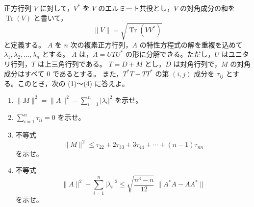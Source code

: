 \newcommand{\C}{\mathbb{C}}
\newcommand{\R}{\mathbb{R}}
\newcommand{\Z}{\mathbb{Z}}
\newcommand{\Tr}{\operatorname{Tr}}
\newcommand{\Impart}{\operatorname{Im}}
\newcommand{\AF}{\operatorname{AF}}
\newcommand{\AX}{\operatorname{AX}}
\newcommand{\GL}{\operatorname{GL}}


正方行列 \(V\) に対して，\(V^*\) を \(V\) のエルミート共役とし，\(V\) の対角成分の和を
\(\Tr(V)\) と書いて，
\[
  \|V\|=\sqrt{\Tr(VV^*)}
\]
と定義する。
\(A\) を \(n\) 次の複素正方行列，\(A\) の特性方程式の解を重複を込めて
\(\lambda_1,\lambda_2,\ldots,\lambda_n\) とする。
\(A\) は，\(A=UTU^*\) の形に分解できる。ただし，\(U\) はユニタリ行列，\(T\) は上三角行列である。
\(T=D+M\) とし，\(D\) は対角行列で，\(M\) の対角成分はすべて \(0\) であるとする。
また，\(T^*T-TT^*\) の第 \((i,j)\) 成分を \(\tau_{ij}\) とする。このとき，次の (1)〜(4) に答えよ。

\begin{enumerate}
  \item \(\displaystyle \|M\|^2=\|A\|^2-\sum_{i=1}^{n}|\lambda_i|^2\) を示せ。
  \item \(\displaystyle \sum_{i=1}^{n}\tau_{ii}=0\) を示せ。
  \item 不等式
  \[
    \|M\|^2\le \tau_{22}+2\tau_{33}+3\tau_{44}+\cdots+(n-1)\tau_{nn}
  \]
  を示せ。
  \item 不等式
  \[
    \|A\|^2-\sum_{i=1}^{n}|\lambda_i|^2
      \le \sqrt{\frac{n^3-n}{12}}\ \|A^*A-AA^*\|
  \]
  を示せ。
\end{enumerate}

%